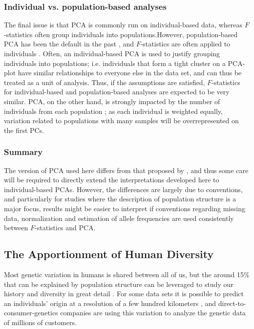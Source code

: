 \documentclass[12pt,fullpage, a4paper]{article}
\begin{document}
\subsubsection{Individual vs. population-based analyses}
The final issue is that PCA is commonly run on individual-based data, whereas $F$-statistics often group individuals into populations.However, population-based PCA has been the default in the past \citep{cavalli-sforza1994}, and $F$-statistics are often applied to individuals \citep[e.g.][]{green2010, massilani2020, yang2020}. Often, an individual-based PCA is used to justify grouping individuals into populations; i.e. individuals that form a tight cluster on a PCA-plot have similar relationships to everyone else in the data set, and can thus be treated as a unit of analysis. Thus, if the assumptions are satisfied, $F$-statistics for individual-based and population-based analyses are expected to be very similar. PCA, on the other hand, is strongly impacted by the number of individuals from each population \citep[e.g.][]{mcvean2009}; as each individual is weighted equally, variation related to populations with many samples will be overrepresented on the first PCs.

\subsubsection{Summary}
The version of PCA used here differs from that proposed by \cite{patterson2006}, and thus some care will be required to directly extend the interpretations developed here to individual-based PCAs. However, the differences are largely due to conventions, and particularly for studies where the description of population structure is a major focus, results might be easier to interpret if conventions regarding missing data, normalization and estimation of allele frequencies are used consistently between $F$-statistics and PCA.

\subsection{The Apportionment of Human Diversity}
Most genetic variation in humans is shared between all of us, but the around 15\% that can be explained by population structure can be leveraged to study our history and diversity in great detail \citep{dobzhansky1972, cavalli-sforza1964, reich2018a}. For some data sets it is possible to predict an individuals' origin at a resolution of a few hundred kilometers \citep{novembre2008, leslie2015}, and direct-to-consumer-genetics companies are using this variation to analyze the genetic data of millions of customers. 
\end{document}
